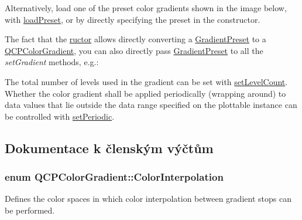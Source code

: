 Alternatively, load one of the preset color gradients shown in the image below, with \hyperlink{classQCPColorGradient_aa0aeec1528241728b9671bf8e60b1622}{load\+Preset}, or by directly specifying the preset in the constructor.



The fact that the \hyperlink{classQCPColorGradient}{ructor} allows directly converting a \hyperlink{classQCPColorGradient_aed6569828fee337023670272910c9072}{Gradient\+Preset} to a \hyperlink{classQCPColorGradient}{Q\+C\+P\+Color\+Gradient}, you can also directly pass \hyperlink{classQCPColorGradient_aed6569828fee337023670272910c9072}{Gradient\+Preset} to all the {\itshape set\+Gradient} methods, e.\+g.\+: 
\begin{DoxyCodeInclude}
\end{DoxyCodeInclude}
 The total number of levels used in the gradient can be set with \hyperlink{classQCPColorGradient_a18da587eb4f7fc788ea28ba15b6a12de}{set\+Level\+Count}. Whether the color gradient shall be applied periodically (wrapping around) to data values that lie outside the data range specified on the plottable instance can be controlled with \hyperlink{classQCPColorGradient_a39d6448155fc00a219f239220d14bb39}{set\+Periodic}. 

\subsection{Dokumentace k členským výčtům}
\hypertarget{classQCPColorGradient_ac5dca17cc24336e6ca176610e7f77fc1}{}
\subsubsection[{Color\+Interpolation}]{\setlength{\rightskip}{0pt plus 5cm}enum {\bf Q\+C\+P\+Color\+Gradient\+::\+Color\+Interpolation}}\label{classQCPColorGradient_ac5dca17cc24336e6ca176610e7f77fc1}


Defines the color spaces in which color interpolation between gradient stops can be performed. 

